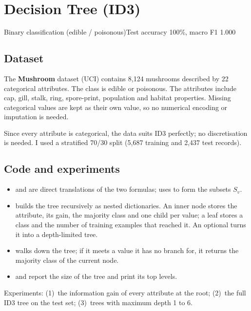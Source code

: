 \chapter{Decision Tree (ID3)}

{Binary classification (edible / poisonous)}{Test accuracy 100\%, macro F1 1.000}

\section{Dataset}
The \textbf{Mushroom} dataset (UCI) contains 8,124 mushrooms described by 22 categorical attributes.
The class is edible or poisonous. The attributes include cap, gill, stalk, ring, spore-print, population
and habitat properties. Missing categorical values are kept as their own value, so no numerical encoding
or imputation is needed.

Since every attribute is categorical, the data suits ID3 perfectly; no discretisation is needed. I used a
stratified 70/30 split (5,687 training and 2,437 test records).

\section{Code and experiments}
\begin{itemize}
\item {} and  are direct translations of the two formulas;
       uses  to form the subsets $S_v$.
\item {} builds the tree recursively as nested dictionaries. An inner node stores the attribute,
      its gain, the majority class and one child per value; a leaf stores a class and the number of
      training examples that reached it. An optional  turns it into a depth-limited tree.
\item {} walks down the tree; if it meets a value it has no branch for, it returns the
      majority class of the current node.
\item {} and  report the size of the tree and print its top levels.
\end{itemize}
\noindent Experiments: (1)~the information gain of every attribute at the root; (2)~the full ID3 tree
on the test set; (3)~trees with maximum depth 1 to 6.

